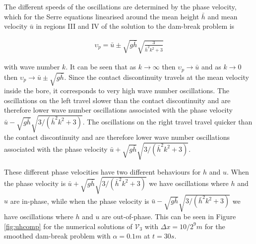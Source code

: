 \documentclass[times]{elsarticle}
\begin{document}
The different speeds of the oscillations are determined by the phase velocity, which for the Serre equations linearised around the mean height $\bar{h}$ and mean velocity $\bar{u}$ in regions III and IV of the solution to the dam-break problem is
\begin{linenomath*}
	\begin{gather}
	\upsilon_p = \bar{u} \pm \sqrt{g\bar{h}} \sqrt{\frac{3}{\bar{h}^2 k^2 + 3}}
	\end{gather}
\end{linenomath*}
with wave number $k$. It can be seen that as $k \rightarrow \infty$ then $\upsilon_p \rightarrow \bar{u}$ and as $k \rightarrow 0$ then $\upsilon_p \rightarrow \bar{u} \pm \sqrt{g\bar{h}}$. Since the contact discontinuity travels at the mean velocity inside the bore, it corresponds to very high wave number oscillations. The oscillations on the left travel slower than the contact discontinuity and are therefore lower wave number oscillations associated with the phase velocity $ \bar{u} - \sqrt{g\bar{h}} \sqrt{3/ (\bar{h}^2 k^2 + 3)}$. The oscillations on the right travel travel quicker than the contact discontinuity and are therefore lower wave number oscillations associated with the phase velocity $ \bar{u} + \sqrt{g\bar{h}} \sqrt{3/ (\bar{h}^2 k^2 + 3)}$.

These different phase velocities have two different behaviours for $h$ and $u$. When the phase velocity is $ \bar{u} + \sqrt{g\bar{h}} \sqrt{3/ (\bar{h}^2 k^2 + 3)}$ we have oscillations where $h$ and $u$ are in-phase, while when the phase velocity is $ \bar{u} - \sqrt{g\bar{h}} \sqrt{3/ (\bar{h}^2 k^2 + 3)}$ we have oscillations where $h$ and $u$ are out-of-phase. This can be seen in Figure \ref{fig:uhcomp} for the numerical solutions of $\mathcal{V}_3$ with $\Delta x = 10/2^{9}m$ for the smoothed dam-break problem with $\alpha = 0.1m$ at $t=30s$.
\end{document}

